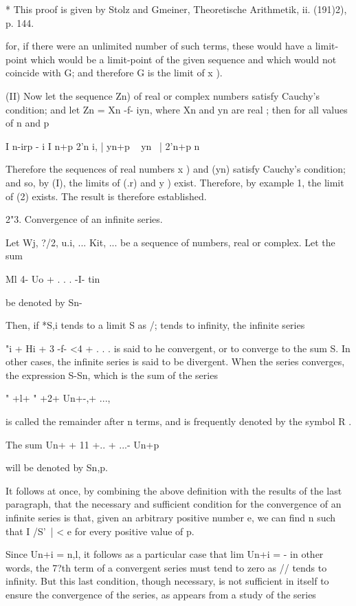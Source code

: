 * This proof is given by Stolz and Gmeiner, Theoretische Arithmetik,
ii. (191)2), p. 144.

%
%

for, if there were an unlimited number of such terms, these would have
a limit-point which would be a limit-point of the given sequence and
which would not coincide with G; and therefore G is the limit of x ).

(II) Now let the sequence Zn) of real or complex numbers satisfy
Cauchy's condition; and let Zn = Xn -f- iyn, where Xn and yn are real
; then for all values of n and p

I n-irp - i I n+p 2'n i, | yn+p ~ yn \ | 2'n+p n\-

Therefore the sequences of real numbers x ) and (yn) satisfy Cauchy's
condition; and so, by (I), the limits of (.r) and y ) exist.
Therefore, by example 1, the limit of (2) exists. The result is
therefore established.

2"3. Convergence of an infinite series.

Let Wj, ?/2, u.i, ... Kit, ... be a sequence of numbers, real or
complex. Let the sum

Ml 4- Uo + . . . -I- tin

be denoted by Sn-

Then, if *S,i tends to a limit S as /; tends to infinity, the
infinite series

"i + Hi + 3 -f- <4 + . . . is said to he convergent, or to converge to
the sum S. In other cases, the infinite series is said to be
divergent. When the series converges, the expression S-Sn, which is
the sum of the series

" +l+ " +2+ Un+-,+ ...,

is called the remainder after n terms, and is frequently denoted by
the symbol R .

The sum Un+ + 11 +.. + ...-\- Un+p

will be denoted by Sn,p.

It follows at once, by combining the above definition with the results
of the last paragraph, that the necessary and sufficient condition for
the convergence of an infinite series is that, given an arbitrary
positive number e, we can find n such that I /S'\ | < e for every
positive value of p.

Since Un+i = n,l, it follows as a particular case that lim Un+i = - in
other words, the 7?th term of a convergent series must tend to zero as
// tends to infinity. But this last condition, though necessary, is
not sufficient in itself to ensure the convergence of the series, as
appears from a study of the series

